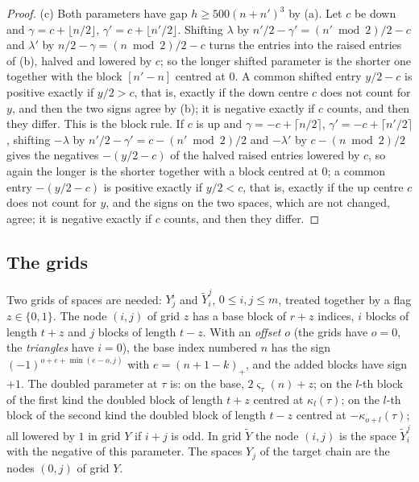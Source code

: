 \begin{proof}
(c) Both parameters have gap $h\ge500(n+n')^3$ by (a). Let $c$ be down and $\gamma=c+\lfloor n/2\rfloor$, $\gamma'=c+\lfloor n'/2\rfloor$. Shifting $\lambda$ by $n'/2-\gamma'=(n'\bmod2)/2-c$ and $\lambda'$ by $n/2-\gamma=(n\bmod2)/2-c$ turns the entries into the raised entries of (b), halved and lowered by $c$; so the longer
shifted parameter is the shorter one together with the block $[n'-n]$ centred at $0$. A common shifted entry $y/2-c$ is positive exactly if $y/2>c$, that is, exactly if the down centre $c$ does not count for $y$, and then the two signs agree by (b); it is negative exactly if $c$ counts, and then they differ. This is the block
rule. If $c$ is up and $\gamma=-c+\lceil n/2\rceil$, $\gamma'=-c+\lceil n'/2\rceil$, shifting $-\lambda$ by $n'/2-\gamma'=c-(n'\bmod2)/2$ and $-\lambda'$ by $c-(n\bmod2)/2$ gives the negatives $-(y/2-c)$ of the halved raised entries lowered by $c$, so again the longer is the shorter together with a block centred at $0$; a common entry $-(y/2-c)$ is positive exactly if $y/2<c$, that is, exactly if the up centre $c$ does not count for $y$, and the signs on the two spaces, which are not changed, agree; it is negative exactly if $c$ counts, and then they differ.
\end{proof}

\subsection{The grids}\label{ss:grids}
Two grids of spaces are needed: $Y^i_j$ and $\tilde Y^j_i$, $0\le i,j\le m$, treated together by a flag
$z\in\{0,1\}$. The node $(i,j)$ of grid $z$ has a base block of $r+z$ indices, $i$ blocks of length $t+z$
and $j$ blocks of length $t-z$. With an \emph{offset} $o$ (the grids have $o=0$, the
\emph{triangles} have $i=0$), the base index numbered $n$ has the sign
$(-1)^{o+e+\min(e-o,j)}$ with $e=(n+1-k)_+$, and the added blocks have sign $+1$. The doubled
parameter at $\tau$ is: on the base, $2\varsigma_\tau(n)+z$; on the $l$-th block of the first kind the
doubled block of length $t+z$ centred at $\kappa_{l}(\tau)$; on the $l$-th block of the second kind the
doubled block of length $t-z$ centred at $-\kappa_{o+l}(\tau)$; all lowered by $1$ in grid $Y$ if $i+j$
is odd. In grid $\tilde Y$ the node $(i,j)$ is the space $\tilde Y^j_i$ with the negative of this
parameter. The spaces $Y_j$ of the target chain are the nodes $(0,j)$ of grid $Y$.

